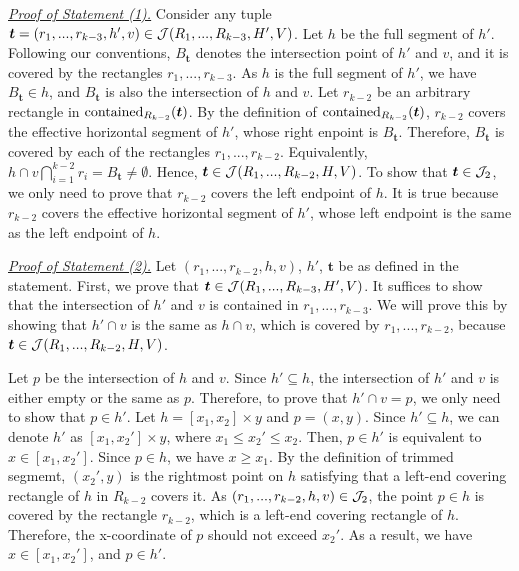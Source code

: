 \noindent \underline{\em Proof of Statement (1).} Consider any tuple $\textrm{\boldmath${t}$} = (r_1,...,r_{k-3}, h', v) \in \mathcal{J}(R_1,...,R_{k-3},H',V)$. Let $h$ be the full segment of $h'$. Following our conventions, $B_\bm{t}$ denotes the intersection point of $h'$ and $v$, and it is covered by the rectangles $r_1,...,r_{k-3}$. As $h$ is the full segment of $h'$, we have $B_\bm{t} \in h$, and $B_\bm{t}$ is also the intersection of $h$ and $v$. Let $r_{k-2}$ be an arbitrary rectangle in $\mathrm{contained}_{R_{k-2}}(\textrm{\boldmath${t}$})$. By the definition of $\mathrm{contained}_{R_{k-2}}(\textrm{\boldmath${t}$})$, $r_{k-2}$ covers the effective horizontal segment of $h'$, whose right enpoint is $B_{\bm{t}}$. Therefore, $B_{\bm{t}}$ is covered by each of the rectangles $r_1,...,r_{k-2}$. Equivalently, $h \cap v \bigcap_{i = 1}^{k-2} r_i = B_\bm{t} \neq \emptyset$. Hence,
$\textrm{\boldmath${t}$} \in \mathcal{J}(R_1,...,R_{k-2},H,V)$. To show that $\textrm{\boldmath${t}$} \in \mathcal{J}_2$, we only need to prove that $r_{k-2}$ covers the left endpoint of $h$. It is true because $r_{k-2}$ covers the effective horizontal segment of $h'$, whose left endpoint is the same as the left endpoint of $h$. 

\vgap 

\noindent \underline{\em Proof of Statement (2).} Let $(r_1,...,r_{k-2},h,v)$, $h'$, $\bm{t}$ be as defined in the statement. First, we prove that $\textrm{\boldmath${t}$}\in \mathcal{J}(R_1,...,R_{k-3}, H', V)$. It suffices to show that the intersection of $h'$ and $v$ is contained in $r_1,...,r_{k-3}$. We will prove this by showing that $h'\cap v$ is the same as $h\cap v$, which is covered by $r_1,...,r_{k-2}$, because $\textrm{\boldmath${t}$} \in \mathcal{J}(R_1,...,R_{k-2},H,V)$.

\vgap 

Let $p$ be the intersection of $h$ and $v$. Since $h' \subseteq h$, the intersection of $h'$ and $v$ is either empty or the same as $p$.
Therefore, to prove that $h' \cap v = p$, we only need to show that $p \in h'$. Let $h = [x_1,x_2]\times y$ and $p = (x,y)$. Since $h' \subseteq h$, we can denote $h'$ as $[x_1, x_2'] \times y$, where $x_1 \le x_2' \le x_2$. Then, $p \in h'$ is equivalent to $x \in [x_1, x_2']$. Since $p \in h$, we have $x \ge x_1$. By the definition of trimmed segmemt, $(x_2',y)$ is the rightmost point on $h$ satisfying that a left-end covering rectangle of $h$ in $R_{k-2}$ covers it. As $(r_1,...,r_{k-2},h,v) \in \mathcal{J}_2$, the point $p \in h$ is covered by the rectangle $r_{k-2}$, which is a left-end covering rectangle of $h$. Therefore, the x-coordinate of $p$ should not exceed $x_2'$. As a result, we have $x \in [x_1, x_2']$, and $p \in h'$.

